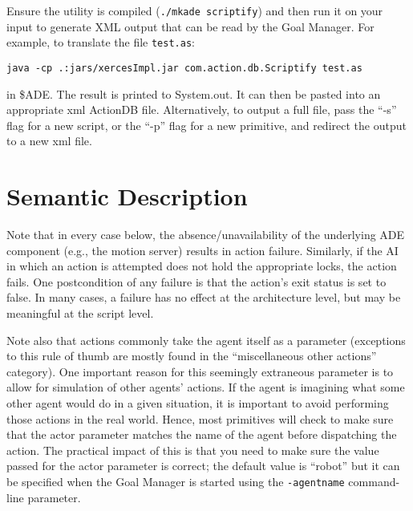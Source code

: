 \documentclass[11pt,letterpaper]{article}
\begin{document}
Ensure the utility is compiled ({\tt ./mkade scriptify}) and then run
it on your input to generate XML output that can be read by the Goal
Manager.  For example, to translate the file {\tt test.as}:

{\tt java -cp .:jars/xercesImpl.jar com.action.db.Scriptify test.as}

\noindent in \$ADE.  The result is printed to System.out.  It can then
be pasted into an appropriate xml ActionDB file.  Alternatively, to
output a full file, pass the ``-s'' flag for a new script, or the
``-p'' flag for a new primitive, and redirect the output to a new xml
file.

\section{Semantic Description}

Note that in every case below, the absence/unavailability of the 
underlying ADE component (e.g., the motion server) results in action 
failure.  
Similarly, if the AI in which an action is 
attempted does not hold the appropriate locks, the action fails.  One
postcondition of any failure is that the action's exit status is set 
to false.  In many cases, a failure has no effect at the architecture 
level, but may be meaningful at the script level.


Note also that actions commonly take the agent itself as a parameter
(exceptions to this rule of thumb are mostly found in the
``miscellaneous other actions'' category).  One important reason for
this seemingly extraneous parameter is to allow for simulation of other
agents' actions.  If the agent is imagining what some other agent
would do in a given situation, it is important to avoid performing
those actions in the real world.  Hence, most primitives will check to
make sure that the actor parameter matches the name of the agent
before dispatching the action.  The practical impact of this is that
you need to make sure the value passed for the actor parameter is
correct; the default value is ``robot'' but it can be specified when
the Goal Manager is started using the {\tt -agentname} command-line
parameter.
\end{document}
